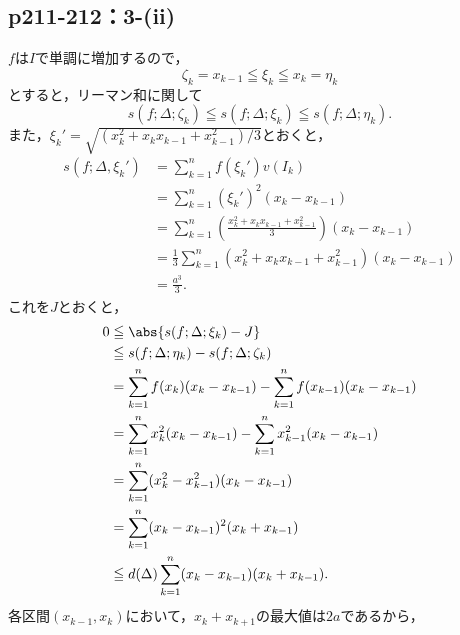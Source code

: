 \documentclass[a4paper,10pt,fleqn]{ltjsarticle}
\begin{document}
\subsection*{p211-212：3-(ii)}
\begin{tleftbar}
    $f$は$I$で単調に増加するので，
    \[
        \zeta_k = x_{k-1} \leqq \xi_k \leqq x_k=\eta_k
    \]
    とすると，リーマン和に関して
    \[
        s(f;\Delta ; \zeta_k ) \leqq s(f;\Delta;\xi_k) \leqq s(f;\Delta;\eta_k).
    \]
    また，$\xi_k' = \sqrt{(x_k ^2 + x_k x_{k-1}+x_{k-1} ^2)/3} $とおくと，
    \begin{align*}
        s(f;\Delta,\xi_k' ) & = \sum_{k=1}^{n} f(\xi_k') v(I_k)                                                         \\
                            & = \sum_{k=1}^{n} (\xi_k')^2 (x_k - x_{k-1})                                               \\
                            & = \sum_{k=1}^{n} \left( \frac{x_k^2 + x_k x_{k-1} + x_{k-1}^2}{3} \right) (x_k - x_{k-1}) \\
                            & = \frac{1}{3} \sum_{k=1}^{n} (x_k^2 + x_k x_{k-1} + x_{k-1}^2) (x_k - x_{k-1})            \\
                            & = \frac{a^3}{3}.
    \end{align*}
    これを$J$とおくと，
    \begin{align*}
        0 & \leqq \abs{ s(f;\Delta; \xi_k) - J }                                                \\
          & \leqq s(f;\Delta;\eta_k) - s(f;\Delta ; \zeta_k )                                   \\
          & = \sum_{k=1}^{n} f(x_k) (x_k - x_{k-1}) - \sum_{k=1}^{n} f(x_{k-1}) (x_k - x_{k-1}) \\
          & = \sum_{k=1}^{n} x_k^2 (x_k - x_{k-1}) - \sum_{k=1}^{n} x_{k-1}^2 (x_k - x_{k-1})   \\
          & = \sum_{k=1}^{n} (x_k^2 - x_{k-1}^2) (x_k - x_{k-1})                                \\
          & = \sum_{k=1}^{n} (x_k - x_{k-1})^2 (x_k + x_{k-1})                                  \\
          & \leqq d(\Delta) \sum_{k=1}^{n} (x_k - x_{k-1}) (x_k + x_{k-1}).
    \end{align*}
    各区間$(x_{k-1},x_k)$において，$x_k + x_{k+1}$の最大値は$2a$であるから，
    \begin{align*}

\end{align*}
\end{tleftbar}
\end{document}
